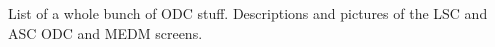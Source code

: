 List of a whole bunch of ODC stuff. Descriptions and pictures of the LSC and ASC ODC and MEDM screens.
